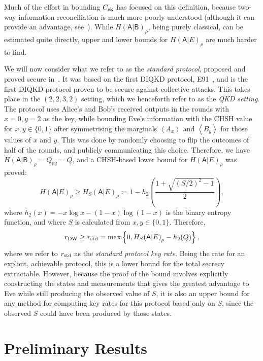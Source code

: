 \documentclass[10pt, a4paper]{article}
\numberwithin{equation}{section} %
\theoremstyle{definition}
\theoremstyle{plain}
\newcommand{\?}{\mathrel{?}} %
\newcommand{\angleb}[1]{\left\langle #1 \right\rangle} %
\newcommand{\crv}[1]{\mathsf{#1}}
\newcommand{\sk}{\rm sk}
\newcommand{\DW}{\rm DW}
\newcommand{\std}{\rm std}
\begin{document}
    Much of the effort in bounding \(C_{\sk}\) has focused on this definition, because two-way information reconciliation is much more poorly understood (although it can provide an advantage, see~\cite{AdvantageDistill}).  While \({H(\crv{A}|\crv{B})}_{\rho}\), being purely classical, can be estimated quite directly, upper and lower bounds for \({H(\crv{A}|E)}_{\rho}\) are much harder to find.

    We will now consider what we refer to as the \emph{standard protocol}, proposed and proved secure in~\cite{DIQKD_Lower}. It was based on the first DIQKD protocol, E91~\cite{E91}, and is the first DIQKD protocol proven to be secure against collective attacks. This takes place in the \((2,2,3,2)\) setting, which we henceforth refer to as the \emph{QKD setting}. The protocol uses Alice's and Bob's received outputs in the rounds with \(x = 0, y = 2\) as the key, while bounding Eve's information with the CHSH value for \(x,y \in \{0,1\}\) after symmetrising the marginals \(\angleb{A_x}\) and \(\angleb{B_y}\) for those values of \(x\) and \(y\). This was done by randomly choosing to flip the outcomes of half of the rounds, and publicly communicating this choice. Therefore, we have \({H(\crv{A}|\crv{B})}_{\rho} = Q_{02} = Q\), and a CHSH-based lower bound for \({H(\crv{A}|E)}_{\rho}\) was proved:
    \begin{equation}
      {H(\crv{A}|E)}_{\rho} \geq {H_S(\crv{A}|E)}_{\rho} \coloneqq 1 - h_2\left( \frac{1 + \sqrt{{(S/2)}^2-1}}{2} \right),
    \end{equation}
    where \(h_2(x) = - x \log x - (1-x) \log (1-x)\) is the binary entropy function, and where \(S\) is calculated from \(x,y \in \{0,1\}\). Therefore,
    \begin{equation}
      r_{\DW} \geq r_{\std} = \max \left\{ 0, {H_S(\crv{A}|E)}_{\rho} - h_2(Q) \right\},
    \end{equation}
    where we refer to \(r_{\std}\) as the \emph{standard protocol key rate}. Being the rate for an explicit, achievable protocol, this is a lower bound for the total secrecy extractable. However, because the proof of the bound involves explicitly constructing the states and measurements that gives the greatest advantage to Eve while still producing the observed value of \(S\), it is also an upper bound for any method for computing key rates for this protocol based only on \(S\), since the observed \(S\) could have been produced by those states.

    \section{Preliminary Results}\label{sec:preres}
\end{document}
